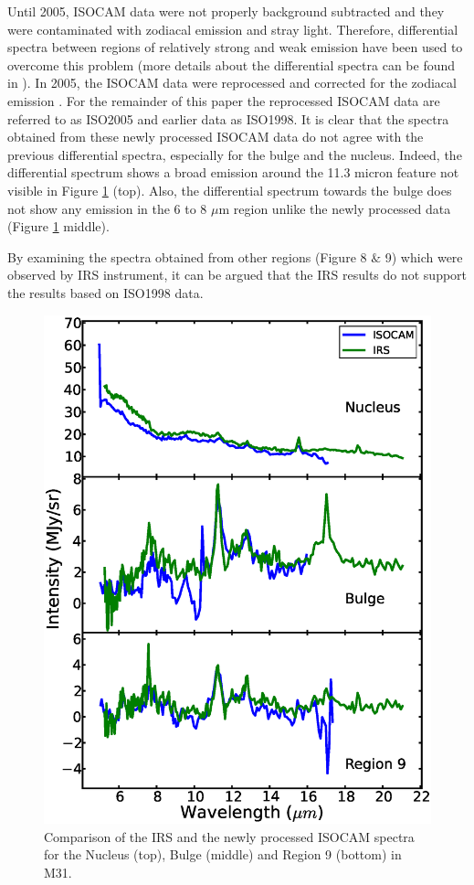 	Until 2005, ISOCAM data were not properly background subtracted and they were contaminated with zodiacal emission and stray light. Therefore, differential spectra between regions of relatively strong and weak emission have been used to overcome this problem (more details about the differential spectra can be found in \citealt{1998Cesarsky}). In 2005, the ISOCAM data were reprocessed  and corrected for the zodiacal emission \citep{Boulanger_F_2005}. For the remainder of this paper the reprocessed ISOCAM data are referred to as ISO2005 and earlier data as ISO1998. It is clear that the spectra obtained from these newly processed ISOCAM data do not agree with the previous differential spectra, especially for the bulge and the nucleus. Indeed, the differential spectrum shows a broad emission around the 11.3 micron feature not visible in Figure \ref{ISOnIRS} (top). Also, the differential spectrum towards the bulge does not show any emission in the 6 to 8 $\mu$m region unlike the newly processed data (Figure \ref{ISOnIRS} middle).

	By examining the spectra obtained from other regions (Figure 8 $\&$ 9) which were observed by IRS instrument, it can be argued that the IRS results do not support the results based on ISO1998 data.


\begin{figure}
\centering
\includegraphics[scale=0.35]{./ISOvsIRS.eps}
\caption{ Comparison of the IRS and the newly processed ISOCAM spectra for the Nucleus (top), Bulge (middle) and Region 9 (bottom) in M31.}
\label{ISOnIRS}
\end{figure}



